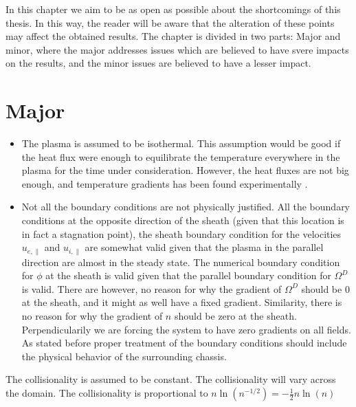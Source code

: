 In this chapter we aim to be as open as possible about the shortcomings of this thesis.
In this way, the reader will be aware that the alteration of these points may affect the obtained results.
The chapter is divided in two parts: Major and minor, where the major addresses issues which are believed to have svere impacts on the results, and the minor issues are believed to have a lesser impact.

\section{Major}
\begin{itemize}[noitemsep,nolistsep]
    \item The plasma is assumed to be isothermal.
        This assumption would be good if the heat flux were enough to equilibrate the temperature everywhere in the plasma for the time under consideration.
        However, the heat fluxes are not big enough, and temperature gradients has been found experimentally \cite{Schroder2003}.
    \item Not all the boundary conditions are not physically justified.
        All the boundary conditions at the opposite direction of the sheath (given that this location is in fact a stagnation point), the sheath boundary condition for the velocities $u_{e,\|}$ and $u_{i,\|}$ are somewhat valid given that the plasma in the parallel direction are almost in the steady state.
        The numerical boundary condition for $\phi$ at the sheath is valid given that the parallel boundary condition for $\Omega^D$ is valid.
        There are however, no reason for why the gradient of $\Omega^D$ should be $0$ at the sheath, and it might as well have a fixed gradient.
        Similarity, there is no reason for why the gradient of $n$ should be zero at the sheath.
        Perpendicularily we are forcing the system to have zero gradients on all fields.
        As stated before proper treatment of the boundary conditions should include the physical behavior of the surrounding chassis.
\end{itemize}



The collisionality is assumed to be constant.
The collisionality will vary across the domain.
The collisionality is proportional to $n\ln(n^{-1/2})=-\frac{1}{2}n\ln(n)$

